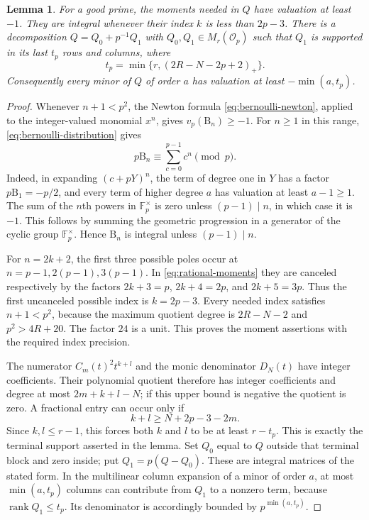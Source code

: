 \documentclass[11pt,letterpaper]{article}
\newtheorem{lemma}[lemma]{Lemma}
\theoremstyle{definition}
\newcommand{\Fp}{\mathbb F_p}
\newcommand{\pos}[1]{\left(#1\right)_{+}}
\DeclareMathOperator{\rank}{rank}
\begin{document}
\begin{lemma}\label{lem:monomial-support}
For a good prime, the moments needed in $Q$ have valuation at least
$-1$. They are integral whenever their index $k$ is less than $2p-3$.
There is a decomposition
$Q=Q_0+p^{-1}Q_1$ with $Q_0,Q_1\in M_r(\mathcal O_p)$ such that
$Q_1$ is supported in its last $t_p$ rows and columns, where
\begin{equation}\label{eq:quotient-terminal-size}
 t_p=\min\{r,\pos{2R-N-2p+2}\}.
\end{equation}
Consequently every minor of $Q$ of order $a$ has valuation at least
$-\min(a,t_p)$.
\end{lemma}
\begin{proof}
Whenever $n+1<p^2$, the Newton formula
\eqref{eq:bernoulli-newton}, applied to the integer-valued monomial
$x^n$, gives $v_p(\mathrm B_n)\ge-1$.
For $n\ge1$ in this range, \eqref{eq:bernoulli-distribution} gives
\[
 p\mathrm B_n\equiv\sum_{c=0}^{p-1}c^n\pmod p.
\]
Indeed, in expanding $(c+pY)^n$, the term of degree one in $Y$
has a factor $p\mathrm B_1=-p/2$, and every term of higher degree
$a$ has valuation at least $a-1\ge1$.
The sum of the $n$th powers in $\Fp^\times$ is zero unless
$(p-1)\mid n$, in which case it is $-1$. This follows by summing
the geometric progression in a generator of the cyclic group
$\Fp^\times$. Hence $\mathrm B_n$ is integral unless $(p-1)\mid n$.

For $n=2k+2$, the first three possible poles occur at
$n=p-1,2(p-1),3(p-1)$. In \eqref{eq:rational-moments} they are
canceled respectively by the factors $2k+3=p$, $2k+4=2p$, and
$2k+5=3p$. Thus the first uncanceled possible index is
$k=2p-3$. Every needed index satisfies $n+1<p^2$, because the
maximum quotient degree is $2R-N-2$ and
$p^2>4R+20$. The factor $24$ is a unit. This proves the moment
assertions with the required index precision.

The numerator $C_m(t)^2t^{k+l}$ and the monic denominator $D_N(t)$
have integer coefficients. Their polynomial quotient therefore has
integer coefficients and degree at most $2m+k+l-N$; if this upper
bound is negative the quotient is zero. A fractional entry can occur
only if
\[
 k+l\ge N+2p-3-2m.
\]
Since $k,l\le r-1$, this forces both $k$ and $l$ to be at least
$r-t_p$. This is exactly the terminal support asserted in the lemma.
Set $Q_0$ equal to $Q$ outside that terminal block and zero inside;
put $Q_1=p(Q-Q_0)$. These are integral matrices of the stated form.
In the multilinear column expansion of a minor of order $a$, at
most $\min(a,t_p)$ columns can contribute from $Q_1$ to a nonzero
term, because $\rank Q_1\le t_p$. Its denominator is accordingly
bounded by $p^{\min(a,t_p)}$.
\end{proof}
\end{document}
